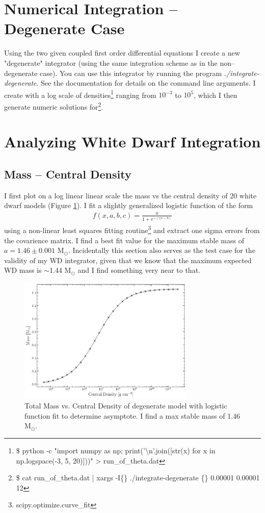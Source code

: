 \section{Numerical Integration -- Degenerate Case}
Using the two given coupled first order differential equations I create a new "degenerate" integrator (using the same integration scheme as in the non--degenerate case). You can use this integrator by running the program \textit{./integrate-degenerate}. See the documentation for details on the command line arguments. I create with a log scale of densities\footnote{\scriptsize \$ python -c "import numpy as np; print('\textbackslash n'.join([str(x) for x in np.logspace(-3, 5, 20)]))" > run\_of\_theta.dat} ranging from $10^{-3}$ to $10^{5}$, which I then generate numeric solutions for\footnote{\$ cat run\_of\_theta.dat | xargs -I\{\} ./integrate-degenerate \{\} 0.00001 0.00001 12}.

\section{Analyzing White Dwarf Integration}
\subsection{Mass -- Central Density}
I first plot on a log linear linear scale the mass vs the central density of 20 white dwarf models (Figure \ref{fig:WDmass}). I fit a slightly generalized logistic function of the form
\begin{align*}
    f(x, a, b, c) = \frac{a}{1+e^{-(cx-b)}}
\end{align*}
using a non-linear least squares fitting routine\footnote{scipy.optimize.curve\_fit} and extract one sigma errors from the covarience matrix. I find a best fit value for the maximum stable mass of $a=1.46\pm0.001$ M$_{\odot}$. Incidentally this section also serves as the test case for the validity of my WD integrator, given that we know that the maximum expected WD mass is $\sim$1.44 M$_{\odot}$ and I find something very near to that.
\begin{figure}[ht!]
    \centering
    \includegraphics[width=0.75\textwidth]{Graphics/WDMasses.pdf}
    \caption{Total Mass vs. Central Density of degenerate model with logistic function fit to determine asymptote. I find a max stable mass of 1.46 M$_{\odot}$.}
    \label{fig:WDmass}
\end{figure}
